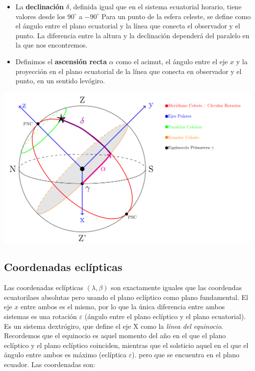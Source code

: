 \hspace{-8.0mm} \vspace{1.0mm} \begin{minipage}{0.6\textwidth}
	\begin{itemize}
		\item La \textbf{declinación} $\delta$, definida igual que en el sistema ecuatorial horario, tiene valores desde los $90^\circ$ a $-90^\circ$ Para un punto de la esfera celeste, se define como el ángulo entre el plano ecuatorial y la línea que conecta el observador y el punto. La diferencia entre la altura y la declinación dependerá del paralelo en la que nos encontremos.
		\item Definimos el \textbf{ascensión recta} $\alpha$ como el acimut, el ángulo entre el eje $x$ y la proyección en el plano ecuatorial de la línea que conecta en observador y el punto, en un sentido levógiro.
	\end{itemize}
\end{minipage}	\hfill
\begin{minipage}{0.35\textwidth} \centering
	\includegraphics[width=1.1\linewidth]{Cuerpo/Ch_01/Coordenadas_Absolutas.png}
	\label{Fig:01-absolutas}
\end{minipage}




\subsection{Coordenadas eclípticas}

Las coordenadas eclípticas $(\lambda,\beta)$ son exactamente iguales que las coordendas ecuatorilaes absolutas pero usando el plano eclíptico como plano fundamental. El eje $x$ entre ambos es el mismo, por lo que la única diferencia entre ambos sistemas es una rotación $\varepsilon$ (ángulo entre el plano eclíptico y el plano ecuatorial). Es un sistema dextrógiro, que define el eje X como la \textit{línea del equinocio}. Recordemos que el equinocio es aquel momento del año en el que el plano eclíptico y el plano eclíptico coinciden, mientras que el solsticio aquel en el que el ángulo entre ambos es máximo (eclíptica $\varepsilon$). pero que se encuentra en el plano ecuador. Las coordenadas son:

